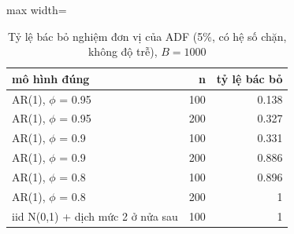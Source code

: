 \begin{table}[H]
\centering\small
\caption{Tỷ lệ bác bỏ nghiệm đơn vị của ADF (5\%, có hệ số chặn, không độ trễ), $B=1000$}\label{tab:tab_b12_04_adf_power}
\begin{adjustbox}{max width=\linewidth}
\begin{tabular}{>{\raggedright\arraybackslash}p{}rr}
\toprule
mô hình đúng & n & tỷ lệ bác bỏ \\
\midrule
AR(1), $\phi$ = 0.95 & 100 & 0.138 \\
AR(1), $\phi$ = 0.95 & 200 & 0.327 \\
AR(1), $\phi$ = 0.9 & 100 & 0.331 \\
AR(1), $\phi$ = 0.9 & 200 & 0.886 \\
AR(1), $\phi$ = 0.8 & 100 & 0.896 \\
AR(1), $\phi$ = 0.8 & 200 & 1 \\
iid N(0,1) + dịch mức 2 ở nửa sau & 100 & 1 \\
\bottomrule
\end{tabular}
\end{adjustbox}
\end{table}
